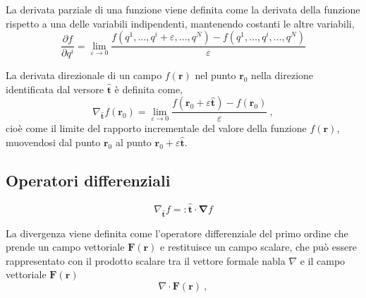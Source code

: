 \begin{definition} La derivata parziale di una funzione viene definita come la derivata della funzione rispetto a una delle variabili indipendenti, mantenendo costanti le altre variabili,
    \begin{equation}
        \dfrac{\partial f}{\partial q^i} = \lim_{\varepsilon \rightarrow 0} \dfrac{f(q^1, \dots, q^i+\varepsilon, \dots, q^N) - f(q^1, \dots, q^i, \dots, q^N) }{\varepsilon}
    \end{equation}
\end{definition}


\begin{definition} La derivata direzionale di un campo $f(\mathbf{r})$ nel punto $\mathbf{r}_0$ nella direzione identificata dal versore $\mathbf{\hat{t}}$ è definita come,
    \begin{equation}
        \nabla_{\mathbf{\hat{t}}} f(\mathbf{r}_0) = \lim_{\varepsilon \rightarrow 0} \dfrac{f(\mathbf{r}_0+\varepsilon \mathbf{\hat{t}})-f(\mathbf{r}_0)}{\varepsilon} \ ,
    \end{equation}
    cioè come il limite del rapporto incrementale del valore della funzione $f(\mathbf{r})$, muovendosi dal punto $\mathbf{r}_0$ al punto $\mathbf{r}_0 + \varepsilon \mathbf{\hat{t}}$.
\end{definition}

\subsection{Operatori differenziali}
\begin{definition}[Gradiente]
    \begin{equation}
        \nabla_{\mathbf{\hat{t}}} f =: \mathbf{\hat{t}} \cdot \mathbf{\nabla} f
    \end{equation}
\end{definition}
\begin{property}
\end{property}
\begin{property}
\end{property}
\begin{property}
\end{property}

\begin{definition}[Divergenza] La divergenza viene definita come l'operatore differenziale del primo ordine che prende un campo vettoriale $\mathbf{F}(\mathbf{r})$ e restituisce un campo scalare, che può essere rappresentato con il prodotto scalare tra il vettore formale nabla $\nabla$ e il campo vettoriale $\mathbf{F}(\mathbf{r})$
    \begin{equation}
        \nabla \cdot \mathbf{F}(\mathbf{r}) \ ,
    \end{equation}
\end{definition}

